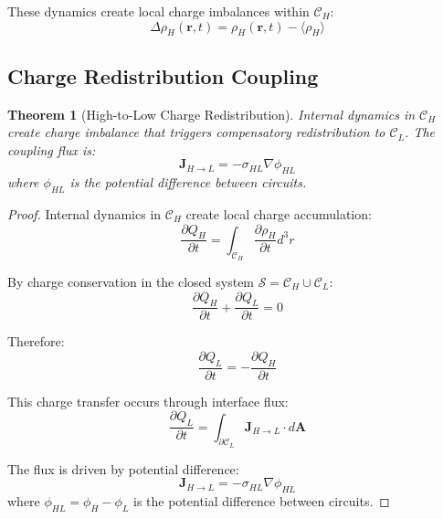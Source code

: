 \documentclass[12pt,a4paper]{article}
\theoremstyle{plain}
\newtheorem{theorem}{Theorem}[section]
\theoremstyle{definition}
\theoremstyle{remark}
\begin{document}
These dynamics create local charge imbalances within $\mathcal{C}_H$:
\begin{equation}
\Delta \rho_H(\mathbf{r}, t) = \rho_H(\mathbf{r}, t) - \langle \rho_H \rangle
\end{equation}

\subsection{Charge Redistribution Coupling}

\begin{theorem}[High-to-Low Charge Redistribution]
\label{thm:high_to_low}
Internal dynamics in $\mathcal{C}_H$ create charge imbalance that triggers compensatory redistribution to $\mathcal{C}_L$. The coupling flux is:
\begin{equation}
\mathbf{J}_{H \to L} = -\sigma_{HL} \nabla \phi_{HL}
\end{equation}
where $\phi_{HL}$ is the potential difference between circuits.
\end{theorem}

\begin{proof}
Internal dynamics in $\mathcal{C}_H$ create local charge accumulation:
\begin{equation}
\frac{\partial Q_H}{\partial t} = \int_{\mathcal{C}_H} \frac{\partial \rho_H}{\partial t} d^3r
\end{equation}

By charge conservation in the closed system $\mathcal{S} = \mathcal{C}_H \cup \mathcal{C}_L$:
\begin{equation}
\frac{\partial Q_H}{\partial t} + \frac{\partial Q_L}{\partial t} = 0
\end{equation}

Therefore:
\begin{equation}
\frac{\partial Q_L}{\partial t} = -\frac{\partial Q_H}{\partial t}
\end{equation}

This charge transfer occurs through interface flux:
\begin{equation}
\frac{\partial Q_L}{\partial t} = \int_{\partial \mathcal{C}_L} \mathbf{J}_{H \to L} \cdot d\mathbf{A}
\end{equation}

The flux is driven by potential difference:
\begin{equation}
\mathbf{J}_{H \to L} = -\sigma_{HL} \nabla \phi_{HL}
\end{equation}
where $\phi_{HL} = \phi_H - \phi_L$ is the potential difference between circuits.
\end{proof}
\end{document}
